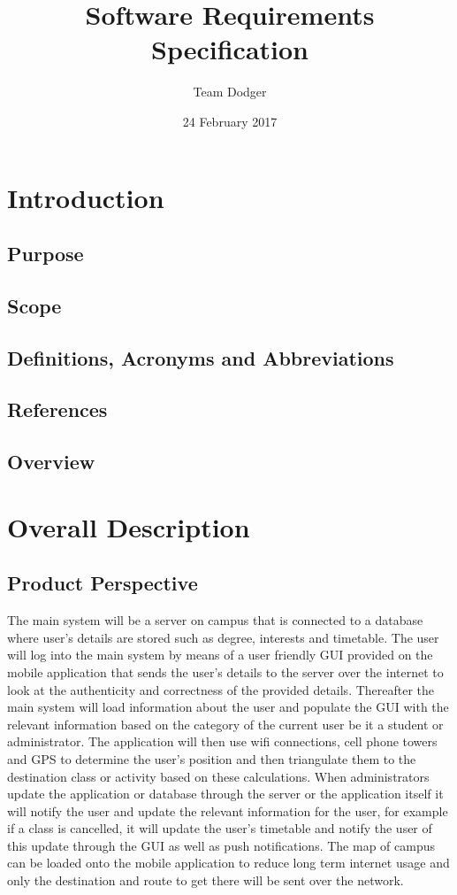 \documentclass{article}
\title{Software Requirements Specification}
\date{24 February 2017}
\author{Team Dodger}
\begin{document}
	\maketitle
	\newpage
	\tableofcontents
	\newpage
	
	\section{Introduction}
	\subsection{Purpose}
	\subsection{Scope}
	\subsection{Definitions, Acronyms and Abbreviations}
	\subsection{References}
	\subsection{Overview}
	
	\section{Overall Description}
	\subsection{Product Perspective}
The main system will be a server on campus that is connected to a database where user's details are stored such as degree, interests and timetable. The user will log into the main system by means of a user friendly GUI provided on the mobile application that sends the user's details to the server over the internet to look at the authenticity and correctness of the provided details. Thereafter the main system will load information about the user and populate the GUI with the relevant information based on the category of the current user be it a student or administrator. The application will then use wifi connections, cell phone towers and GPS to determine the user's position and then triangulate them to the destination class or activity based on these calculations. When administrators update the application or database through the server or the application itself it will notify the user and update the relevant information for the user, for example if a class is cancelled, it will update the user's timetable and notify the user of this update through the GUI as well as push notifications. The map of campus can be loaded onto the mobile application to reduce long term internet usage and only the destination and route to get there will be sent over the network.
\end{document}

